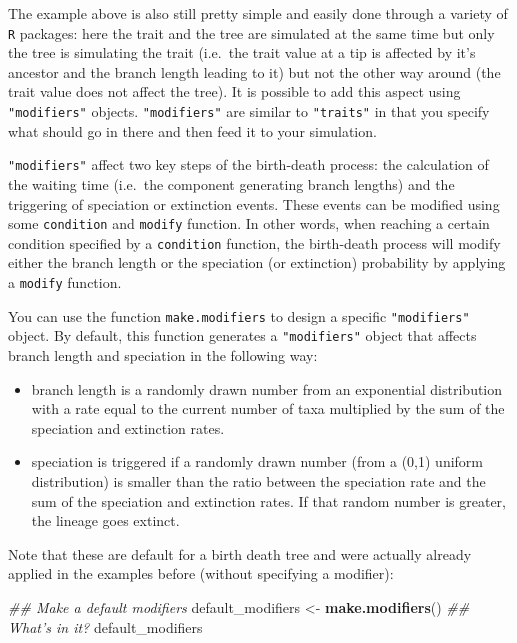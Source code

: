 \documentclass[]{book}
\newenvironment{Shaded}{\begin{snugshade}}{\end{snugshade}}
\newcommand{\CommentTok}[1]{\textcolor[rgb]{0.56,0.35,0.01}{\textit{#1}}}
\newcommand{\KeywordTok}[1]{\textcolor[rgb]{0.13,0.29,0.53}{\textbf{#1}}}
\newcommand{\NormalTok}[1]{#1}
\newcommand{\StringTok}[1]{\textcolor[rgb]{0.31,0.60,0.02}{#1}}
\providecommand{\tightlist}{%
  \setlength{\itemsep}{0pt}\setlength{\parskip}{0pt}}
\begin{document}
The example above is also still pretty simple and easily done through a variety of \texttt{R} packages: here the trait and the tree are simulated at the same time but only the tree is simulating the trait (i.e.~the trait value at a tip is affected by it's ancestor and the branch length leading to it) but not the other way around (the trait value does not affect the tree).
It is possible to add this aspect using \texttt{"modifiers"} objects.
\texttt{"modifiers"} are similar to \texttt{"traits"} in that you specify what should go in there and then feed it to your simulation.

\texttt{"modifiers"} affect two key steps of the birth-death process: the calculation of the waiting time (i.e.~the component generating branch lengths) and the triggering of speciation or extinction events.
These events can be modified using some \texttt{condition} and \texttt{modify} function.
In other words, when reaching a certain condition specified by a \texttt{condition} function, the birth-death process will modify either the branch length or the speciation (or extinction) probability by applying a \texttt{modify} function.

You can use the function \texttt{make.modifiers} to design a specific \texttt{"modifiers"} object.
By default, this function generates a \texttt{"modifiers"} object that affects branch length and speciation in the following way:

\begin{itemize}
\tightlist
\item
  branch length is a randomly drawn number from an exponential distribution with a rate equal to the current number of taxa multiplied by the sum of the speciation and extinction rates.
\item
  speciation is triggered if a randomly drawn number (from a (0,1) uniform distribution) is smaller than the ratio between the speciation rate and the sum of the speciation and extinction rates. If that random number is greater, the lineage goes extinct.
\end{itemize}

Note that these are default for a birth death tree and were actually already applied in the examples before (without specifying a modifier):

\begin{Shaded}
\begin{Highlighting}[]
\CommentTok{## Make a default modifiers}
\NormalTok{default_modifiers <-}\StringTok{ }\KeywordTok{make.modifiers}\NormalTok{()}
\CommentTok{## What's in it?}
\NormalTok{default_modifiers}
\end{Highlighting}
\end{Shaded}
\end{document}
